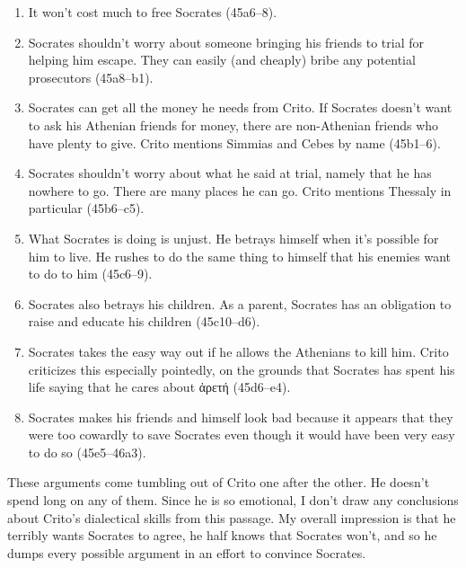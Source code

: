 \documentclass[12pt,letterpaper]{article}
\begin{document}
\begin{enumerate}

    \item It won't cost much to free Socrates (45a6--8).

    \item Socrates shouldn't worry about someone bringing his friends to trial for helping him escape. They can easily (and cheaply) bribe any potential prosecutors (45a8--b1).

    \item Socrates can get all the money he needs from Crito. If Socrates doesn't want to ask his Athenian friends for money, there are non-Athenian friends who have plenty to give. Crito mentions Simmias and Cebes by name (45b1--6).

    \item Socrates shouldn't worry about what he said at trial, namely that he has nowhere to go. There are many places he can go. Crito mentions Thessaly in particular (45b6--c5).

    \item What Socrates is doing is unjust. He betrays himself when it's possible for him to live. He rushes to do the same thing to himself that his enemies want to do to him (45c6--9).

    \item Socrates also betrays his children. As a parent, Socrates has an obligation to raise and educate his children (45c10--d6).

    \item Socrates takes the easy way out if he allows the Athenians to kill him. Crito criticizes this especially pointedly, on the grounds that Socrates has spent his life saying that he cares about \textgreek{ἀρετή} (45d6--e4).

    \item Socrates makes his friends and himself look bad because it appears that they were too cowardly to save Socrates even though it would have been very easy to do so (45e5--46a3).

\end{enumerate}

These arguments come tumbling out of Crito one after the other. He doesn't spend long on any of them. Since he is so emotional, I don't draw any conclusions about Crito's dialectical skills from this passage. My overall impression is that he terribly wants Socrates to agree, he half knows that Socrates won't, and so he dumps every possible argument in an effort to convince Socrates.
\end{document}
